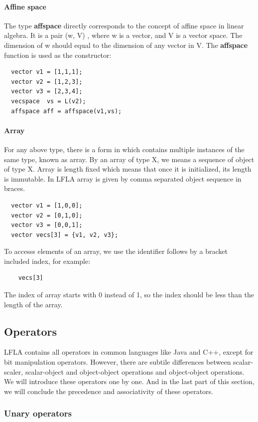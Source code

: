 \documentclass[12pt]{article} %
\begin{document}
\paragraph{Affine space}
The type \textbf{affspace} directly corresponds to the concept of affine space in linear algebra. It is a pair
(w, V) , where w is a vector, and V is a vector space. The dimension of w should equal to the dimension of any vector in V. The \textbf{affspace} function is used as the constructor:
 \begin{lstlisting} 
  vector v1 = [1,1,1];
  vector v2 = [1,2,3];
  vector v3 = [2,3,4];
  vecspace  vs = L(v2);
  affspace aff = affspace(v1,vs);
\end{lstlisting}
\paragraph{Array}
For any above type, there is a form in which contains multiple instances of the same type, known as array. By an array of type X, we means a sequence of object of type X. Array is length fixed which means that once it is initialized, its length is immutable. In LFLA  array is  given by  comma separated object sequence in braces.  
 \begin{lstlisting}
  vector v1 = [1,0,0];
  vector v2 = [0,1,0];
  vector v3 = [0,0,1];  
  vector vecs[3] = {v1, v2, v3}; 
\end{lstlisting}

To accesss elements of an array,  we use the identifier follows by a bracket included index, for example:
 \begin{lstlisting}
    vecs[3] 
\end{lstlisting}
The index of array starts with 0 instead of 1,  so the index should be less than the length of the array. 
\subsection{Operators} %
LFLA contains all operators in common languages like Java and C++, except for bit manipulation operators. However, there are subtile differences between scalar-scaler, scalar-object and object-object operations and object-object operations. We will introduce these operators one by one. And in the last part of this section, we will conclude the precedence and associativity of these operators.
\subsubsection{Unary operators}
\end{document}
